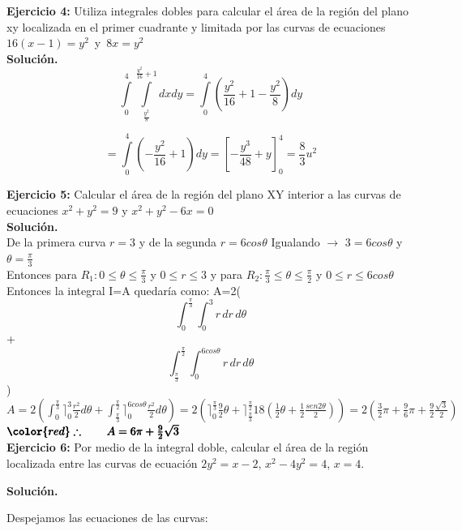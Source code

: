 \documentclass[12pt]{article}
\begin{document}
\noindent \textbf{Ejercicio 4:} Utiliza integrales dobles para calcular el área de la región del plano xy localizada en el primer cuadrante y limitada por las curvas de ecuaciones $16(x-1)={{y}^{2}}$\ y\ $8x={{y}^{2}}$
\\[10pt]
\textbf{Solución.}
\\[10pt]
\[\int\limits_{0}^{4}{\int\limits_{\frac{{{y}^{2}}}{8}}^{\frac{{{y}^{2}}}{16}+1}{dxdy=\int\limits_{0}^{4}{(\frac{{{y}^{2}}}{16}+1-\frac{{{y}^{2}}}{8})dy}}}\]

\[=\int\limits_{0}^{4}{(-\frac{{{y}^{2}}}{16}+1)dy=\left[ -\frac{{{y}^{3}}}{48}+y \right]_{0}^{4}=\frac{8}{3}{{u}^{2}}}\]

\noindent \textbf{Ejercicio 5:} Calcular el área de la región del plano XY interior a las curvas de ecuaciones $x^2+y^2=9$ y $x^2+y^2-6x=0$
\\[10pt]
\textbf{Solución.}
\\[10pt]
De la primera curva $r=3$ y de la segunda $r=6cos\theta$ Igualando $\rightarrow$ $3=6cos\theta$ y $\theta=\frac{\pi}{3}$
\\[2pt]
Entonces para $R_{1}: 0\leq \theta \leq \frac{\pi}{3}$ y $0\leq r \leq3$ y para $R_{2}: \frac{\pi}{3}\leq \theta \leq \frac{\pi}{2}$ y $0\leq r \leq6cos\theta$
\\[2pt]
Entonces la integral I=A quedaría como:
A=2(\[ \int_{0}^{\frac{\pi}{3}} \int_{0}^{3} r \,dr\,d\theta \]+\[ \int_{\frac{\pi}{3}}^{\frac{\pi}{2}} \int_{0}^{6cos\theta} r \,dr\,d\theta \])
\\[2pt]
$A=2(\int_{0}^{\frac{\pi}{3}}\rceil_{0}^{3} \frac{r^2}{2}d\theta+\int_{\frac{\pi}{3}}^{\frac{\pi}{2}}\rceil_{0}^{6cos\theta} \frac{r^2}{2}d\theta)=2(\rceil_{0}^{\frac{\pi}{3}}\frac{9}{2}\theta+\rceil_{\frac{\pi}{3}}^\frac{\pi}{2}18(\frac{1}{2}\theta+\frac{1}{2}\frac{sen2\theta}{2}))=2(\frac{3}{2}\pi+\frac{9}{6}\pi+\frac{9}{2}\frac{\sqrt{3}}{2})$
\\[9pt]
$\pmb{\color{red} \therefore \qquad A= 6\pi+\frac{9}{2}\sqrt{3}}$
\\[15pt]

\noindent \textbf{Ejercicio 6:} Por medio de la integral doble, calcular el área de la región localizada entre las curvas de ecuación $2y^2=x-2$, $x^2-4y^2=4$, $x=4$.

\vspace{5mm}

\noindent \textbf{Solución.}

\vspace{5mm}

\noindent Despejamos las ecuaciones de las curvas:
\end{document}
